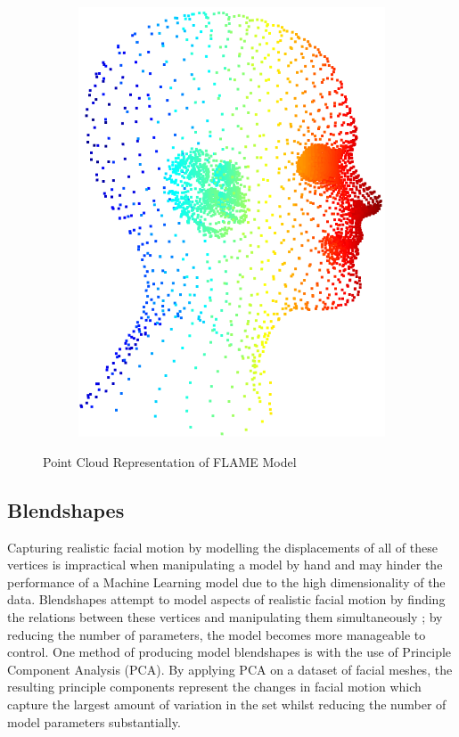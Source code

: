 \begin{figure}[h]
\begin{subfigure}[b]{0.28\textwidth}
        \includegraphics[width=\textwidth]{figures/dataset/flame_side.png}
    \end{subfigure}
    \caption{Point Cloud Representation of FLAME Model \cite{Li2017}}\label{fig:FLAME_Point_Cloud}
\end{figure}

\subsection{Blendshapes} \label{blendshapes}
Capturing realistic facial motion by modelling the displacements of all of these vertices is impractical when manipulating a model by hand and may hinder the performance of a Machine Learning model due to the high dimensionality of the data.
Blendshapes attempt to model aspects of realistic facial motion by finding the relations between these vertices and manipulating them simultaneously \cite{Lewis2010}; by reducing the number of parameters, the model becomes more manageable to control.
One method of producing model blendshapes is with the use of Principle Component Analysis (PCA).
By applying PCA on a dataset of facial meshes, the resulting principle components represent the changes in facial motion which capture the largest amount of variation in the set whilst reducing the number of model parameters substantially.

